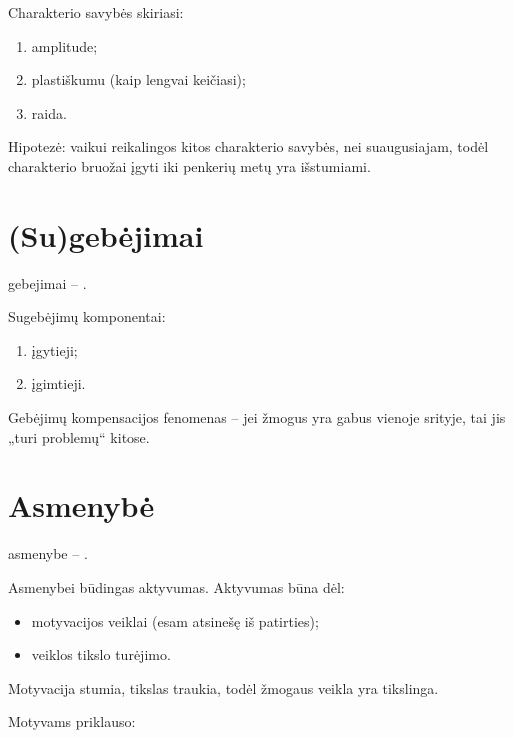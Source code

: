 Charakterio savybės skiriasi:

\begin{enumerate}
  \item amplitude;
  \item plastiškumu (kaip lengvai keičiasi);
  \item raida.
\end{enumerate}

Hipotezė: vaikui reikalingos kitos charakterio savybės, nei suaugusiajam,
todėl charakterio bruožai įgyti iki penkerių metų yra išstumiami.

\section{(Su)gebėjimai}

\Gls{gebejimai} – .

Sugebėjimų komponentai:

\begin{enumerate}
  \item įgytieji;
  \item įgimtieji.
\end{enumerate}

Gebėjimų kompensacijos fenomenas – jei žmogus yra gabus vienoje srityje, 
tai jis „turi problemų“ kitose.

\section{Asmenybė}

\Gls{asmenybe} – .

Asmenybei būdingas aktyvumas. Aktyvumas būna dėl:

\begin{itemize}
  \item motyvacijos veiklai (esam atsinešę iš patirties);
  \item veiklos tikslo turėjimo.
\end{itemize}

Motyvacija stumia, tikslas traukia, todėl žmogaus veikla yra tikslinga.

Motyvams priklauso:

